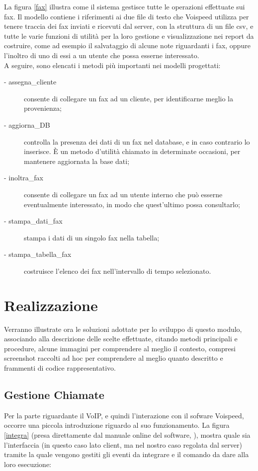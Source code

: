 \noindent
La figura \ref{fax} illustra come il sistema gestisce tutte le operazioni effettuate sui fax. Il modello contiene i riferimenti ai due file di testo che Voispeed utilizza per tenere traccia dei fax inviati e ricevuti dal server, con la struttura di un file csv, e tutte le varie funzioni di utilit\`a per la loro gestione e visualizzazione nei report da costruire, come ad esempio il salvataggio di alcune note riguardanti i fax, oppure l'inoltro di uno di essi a un utente che possa esserne interessato. \\
A seguire, sono elencati i metodi pi\`u importanti nei modelli progettati:
\begin{description}
\item[- assegna\_cliente] consente di collegare un fax ad un cliente, per identificarne meglio la provenienza;
\item[- aggiorna\_DB] controlla la presenza dei dati di un fax nel database, e in caso contrario lo inserisce. \`E un metodo d'utilit\`a chiamato in determinate occasioni, per mantenere aggiornata la base dati;
\item[- inoltra\_fax] consente di collegare un fax ad un utente interno che pu\`o esserne eventualmente interessato, in modo che quest'ultimo possa consultarlo;
\item[- stampa\_dati\_fax] stampa i dati di un singolo fax nella tabella;
\item[- stampa\_tabella\_fax] costruisce l'elenco dei fax nell'intervallo di tempo selezionato.
\end{description}

\newpage
\section{Realizzazione}
Verranno illustrate ora le soluzioni adottate per lo sviluppo di questo modulo, associando alla descrizione delle scelte effettuate, citando metodi principali e procedure, alcune immagini per comprendere al meglio il contesto, compresi screenshot raccolti ad hoc per comprendere al meglio quanto descritto e frammenti di codice rappresentativo.
\subsection{Gestione Chiamate}
Per la parte riguardante il VoIP, e quindi l'interazione con il sofware Voispeed, occorre una piccola introduzione riguardo al suo funzionamento. La figura \ref{integra} (presa direttamente dal manuale online del software, \cite{voispeed}), mostra quale sia l'interfaccia (in questo caso lato client, ma nel nostro caso regolata dal server) tramite la quale vengono gestiti gli eventi da integrare e il comando da dare alla loro esecuzione: \\

